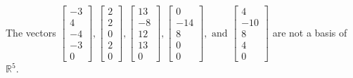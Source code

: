 \begin{exercise}
\begin{exerciseStatement}
  \end{exerciseStatement}
  \begin{exerciseAnswer}
   The vectors \(\left[\begin{array}{r}
-3 \\
4 \\
-4 \\
-3 \\
0
\end{array}\right] , \left[\begin{array}{r}
2 \\
2 \\
0 \\
2 \\
0
\end{array}\right] , \left[\begin{array}{r}
13 \\
-8 \\
12 \\
13 \\
0
\end{array}\right] , \left[\begin{array}{r}
0 \\
-14 \\
8 \\
0 \\
0
\end{array}\right] , \text{ and } \left[\begin{array}{r}
4 \\
-10 \\
8 \\
4 \\
0
\end{array}\right]\) 
  	 are not  a basis of \(\mathbb{R}^5\).
  


  \end{exerciseAnswer}
\end{exercise}